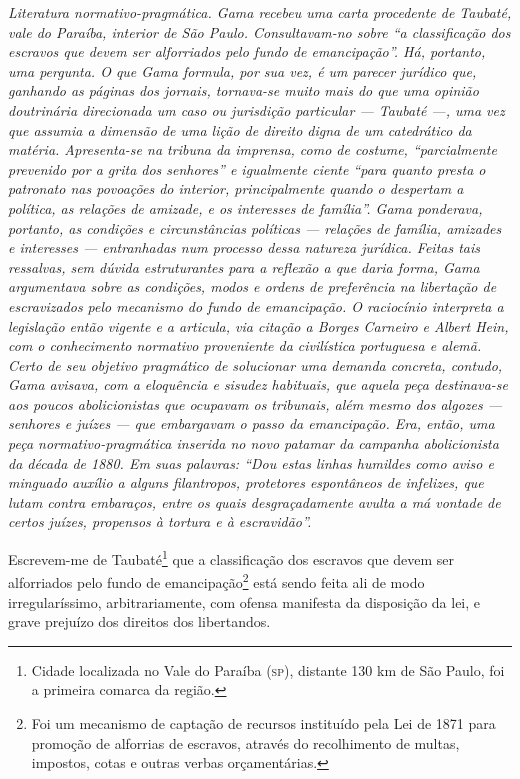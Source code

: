 \begin{resumo}
\emph{Literatura normativo-pragmática. Gama recebeu uma carta procedente
de Taubaté, vale do Paraíba, interior de São Paulo. Consultavam-no sobre
``a classificação dos escravos que devem ser alforriados pelo fundo de
emancipação''. Há, portanto, uma pergunta. O que Gama formula, por sua
vez, é um parecer jurídico que, ganhando as páginas dos jornais,
tornava-se muito mais do que uma opinião doutrinária direcionada um caso
ou jurisdição particular --- Taubaté ---, uma vez que assumia a dimensão
de uma lição de direito digna de um catedrático da matéria. Apresenta-se
na tribuna da imprensa, como de costume, ``parcialmente prevenido por a
grita dos senhores'' e igualmente ciente ``para quanto presta o patronato
nas povoações do interior, principalmente quando o despertam a política,
as relações de amizade, e os interesses de família''. Gama ponderava,
portanto, as condições e circunstâncias políticas --- relações de
família, amizades e interesses --- entranhadas num processo dessa
natureza jurídica. Feitas tais ressalvas, sem dúvida estruturantes para
a reflexão a que daria forma, Gama argumentava sobre as condições, modos
e ordens de preferência na libertação de escravizados pelo mecanismo do
fundo de emancipação. O raciocínio interpreta a legislação então vigente
e a articula, via citação a Borges Carneiro e Albert Hein, com o
conhecimento normativo proveniente da civilística portuguesa e alemã.
Certo de seu objetivo pragmático de solucionar uma demanda concreta,
contudo, Gama avisava, com a eloquência e sisudez habituais, que aquela
peça destinava-se aos poucos abolicionistas que ocupavam os tribunais,
além mesmo dos algozes --- senhores e juízes --- que embargavam o passo da
emancipação. Era, então, uma peça normativo-pragmática inserida no novo
patamar da campanha abolicionista da década de 1880. Em suas palavras:
``Dou estas linhas humildes como aviso e minguado auxílio a alguns
filantropos, protetores espontâneos de infelizes, que lutam contra
embaraços, entre os quais desgraçadamente avulta a má vontade de certos
juízes, propensos à tortura e à escravidão''.}
\end{resumo}

Escrevem-me de Taubaté\footnote{Cidade localizada no Vale do Paraíba
  (\textsc{sp}), distante 130 km de São Paulo, foi a primeira comarca da região.}
que a classificação dos escravos que devem ser alforriados pelo fundo de
emancipação\footnote{Foi um mecanismo de captação de recursos
  instituído pela Lei de 1871 para promoção de alforrias de escravos,
  através do recolhimento de multas, impostos, cotas e outras verbas
  orçamentárias.} está sendo feita ali de modo irregularíssimo,
arbitrariamente, com ofensa manifesta da disposição da lei, e grave
prejuízo dos direitos dos libertandos.

